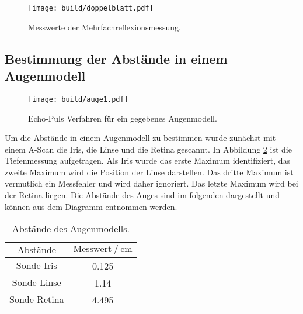 \begin{figure}
  \centering
  \texttt{[image: build/doppelblatt.pdf]}
  \caption{Messwerte der Mehrfachreflexionsmessung.}
  \label{fig:platten}
\end{figure}

\newpage

\subsection{Bestimmung der Abstände in einem Augenmodell}
\begin{figure}
  \centering
  \texttt{[image: build/auge1.pdf]}
  \caption{Echo-Puls Verfahren für ein gegebenes Augenmodell.}
  \label{fig:auge1}
\end{figure}

Um die Abstände in einem Augenmodell zu bestimmen wurde zunächst mit einem
A-Scan die Iris, die Linse und die Retina gescannt. In Abbildung
\ref{fig:auge1} ist die Tiefenmessung aufgetragen.
Als Iris wurde das erste Maximum identifiziert, das zweite Maximum wird die
Position der Linse darstellen. Das dritte Maximum ist vermutlich ein Messfehler
und wird daher ignoriert. Das letzte Maximum wird bei der Retina liegen.
Die Abstände des Auges sind im folgenden dargestellt und können aus dem
Diagramm entnommen werden.

\begin{table}
  \centering
  \caption{Abstände des Augenmodells.}
  \label{fig:augwerte}
  \begin{tabular}{S S}
    \toprule
    {$\text{Abstände}$}
    & {$\text{Messwert} \:/\: \si{\centi\meter}$} \\
    \midrule
    $\text{Sonde-Iris}$   & 0.125 \\
    $\text{Sonde-Linse}$  & 1.14  \\
    $\text{Sonde-Retina}$ & 4.495 \\
    \bottomrule
  \end{tabular}
\end{table}
